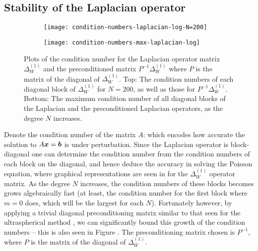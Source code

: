 \subsection{Stability of the Laplacian operator}

\begin{figure}[tp]
	\centering
	\begin{subfigure}[b]{0.55\textwidth}
		\centerline{\texttt{[image: condition-numbers-laplacian-log-N=200]}}
	\end{subfigure}
	\hfill%
	
	\begin{subfigure}[b]{0.55\textwidth}
		\centerline{\texttt{[image: condition-numbers-max-laplacian-log]}}
	\end{subfigure}
	\hfill%
	\caption{Plots of the condition number for the Laplacian operator matrix $\Delta^{(1)}_W$ and the preconditioned matrix $P^{-1} \Delta^{(1)}_W$ where $P$ is the matrix of the diagonal of $\Delta^{(1)}_W$. Top: The condition numbers of each diagonal block of $\Delta^{(1)}_W$ for $N = 200$, as well as those for $P^{-1} \Delta^{(1)}_W$. Bottom: The maximum condition number of all diagonal blocks of the Laplacian and the preconditioned Laplacian operators, as the degree $N$ increases.}
	\label{fig:sc:conditionnumbers}
\end{figure}

Denote the condition number of the matrix $A$: 
which encodes how accurate the solution to $A \mbox{\boldmath$x$\unboldmath} = \mbox{\boldmath$b$\unboldmath}$ is under perturbation.
Since the Laplacian operator is block-diagonal one can determine the condition number from the condition numbers of each block on the diagonal,  and hence deduce the accuracy in solving the Poisson equation, where graphical representations are seen in  for the $\Delta^{(1)}_W$ operator matrix. As the degree $N$ increases, the condition numbers of these blocks becomes grows  algebraically fast (at least, the condition number for the first block where $m=0$ does, which will be the largest for each $N$). Fortunately however, by applying a trivial diagonal preconditioning matrix similar to that seen for the ultraspherical method \cite{olver2013fast}, we can significantly bound this growth of the condition numbers -- this is also seen in Figure . The preconditioning matrix chosen is $P^{-1}$, where $P$ is the matrix of the diagonal of $\Delta^{(1)}_W$. 



